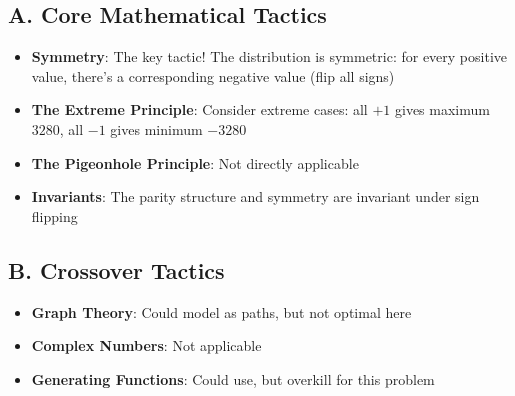 \documentclass[12pt]{article}
\begin{document}
\begin{tacticalbox}
\subsection*{A. Core Mathematical Tactics}
\begin{itemize}[leftmargin=*]
    \item \textbf{Symmetry}: The key tactic! The distribution is symmetric: for every positive value, there's a corresponding negative value (flip all signs)
    \item \textbf{The Extreme Principle}: Consider extreme cases: all $+1$ gives maximum $3280$, all $-1$ gives minimum $-3280$
    \item \textbf{The Pigeonhole Principle}: Not directly applicable
    \item \textbf{Invariants}: The parity structure and symmetry are invariant under sign flipping
\end{itemize}

\subsection*{B. Crossover Tactics}
\begin{itemize}[leftmargin=*]
    \item \textbf{Graph Theory}: Could model as paths, but not optimal here
    \item \textbf{Complex Numbers}: Not applicable
    \item \textbf{Generating Functions}: Could use, but overkill for this problem
\end{itemize}
\end{tacticalbox}
\end{document}
